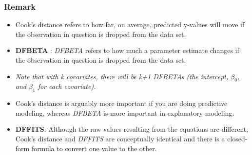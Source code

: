 \documentclass[residuals.tex]{subfiles}
\begin{document}
\newpage	

\subsubsection*{Remark}	

\begin{itemize}
\item Cook's distance refers to how far, on average, predicted y-values will move if the observation in question is dropped from the data set. 
\item \textbf{DFBETA} :  \textit{DFBETA} refers to how much a parameter estimate changes if the observation in question is dropped from the data set.

\item  \textit{Note that with k covariates, there will be k+1 DFBETAs (the intercept, $\beta_0$, and $\beta_1$ for each covariate).}
\item  Cook's distance is arguably more important if you are doing predictive modeling, whereas \textit{DFBETA} is more important in explanatory modeling.
\item \textbf{DFFITS}: Although the raw values resulting from the equations are different, Cook's distance and \textit{DFFITS} are conceptually identical and there is a closed-form formula to convert one value to the other.
\end{itemize}
\end{document}
